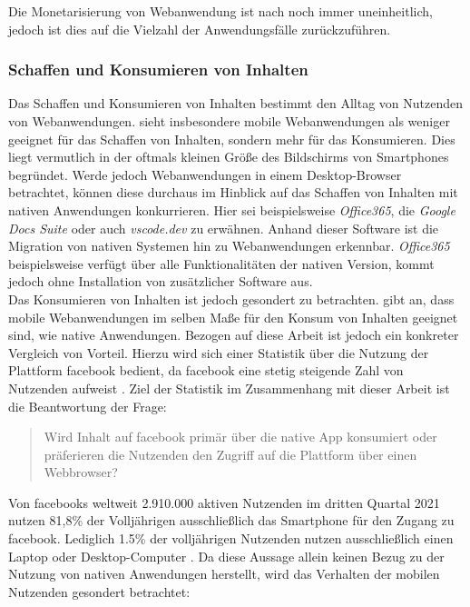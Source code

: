 \documentclass[a4paper]{scrartcl}
\begin{document}
Die Monetarisierung von Webanwendung ist nach \textcite[28]{Jobe} noch immer uneinheitlich, jedoch ist dies auf die Vielzahl der Anwendungsfälle zurückzuführen.

\subsubsection{Schaffen und Konsumieren von Inhalten}

Das Schaffen und Konsumieren von Inhalten bestimmt den Alltag von Nutzenden von Webanwendungen. \textcite[28]{Jobe} sieht insbesondere mobile Webanwendungen als weniger geeignet für das Schaffen von Inhalten, sondern mehr für das Konsumieren. Dies liegt vermutlich in der oftmals kleinen Größe des Bildschirms von Smartphones begründet. Werde jedoch Webanwendungen in einem Desktop-Browser betrachtet, können diese durchaus im Hinblick auf das Schaffen von Inhalten mit nativen Anwendungen konkurrieren. Hier sei beispielsweise \textit{Office365}, die \textit{Google Docs Suite} oder auch \textit{vscode.dev} zu erwähnen. Anhand dieser Software ist die Migration von nativen Systemen hin zu Webanwendungen erkennbar. \textit{Office365} beispielsweise verfügt über alle Funktionalitäten der nativen Version, kommt jedoch ohne Installation von zusätzlicher Software aus. \\

Das Konsumieren von Inhalten ist jedoch gesondert zu betrachten. \textcite[28]{Jobe} gibt an, dass mobile Webanwendungen im selben Maße für den Konsum von Inhalten geeignet sind, wie native Anwendungen. Bezogen auf diese Arbeit ist jedoch ein konkreter Vergleich von Vorteil. Hierzu wird sich einer Statistik über die Nutzung der Plattform facebook bedient, da facebook eine stetig steigende Zahl von Nutzenden aufweist \autocite{Statista_Facebook}. Ziel der Statistik im Zusammenhang mit dieser Arbeit ist die Beantwortung der Frage: 
\begin{quote}
	Wird Inhalt auf facebook primär über die native App konsumiert oder präferieren die Nutzenden den Zugriff auf die Plattform über einen Webbrowser?
\end{quote}

Von facebooks weltweit 2.910.000 aktiven Nutzenden im dritten Quartal 2021 \textcite{Statista_Facebook} nutzen 81,8\% der Volljährigen ausschließlich das Smartphone für den Zugang zu facebook. Lediglich 1.5\% der volljährigen Nutzenden nutzen ausschließlich einen Laptop oder Desktop-Computer \textcite{Kemp_Facebook}. Da diese Aussage allein keinen Bezug zu der Nutzung von nativen Anwendungen herstellt, wird das Verhalten der mobilen Nutzenden gesondert betrachtet: 
\end{document}
